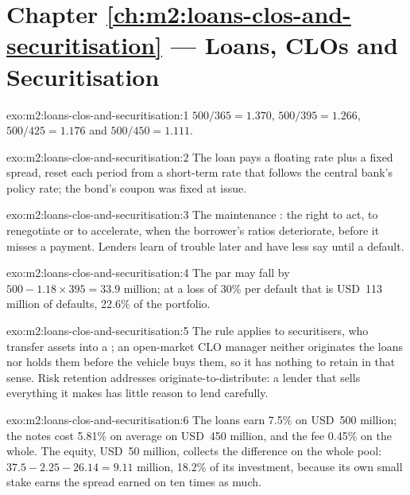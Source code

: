 \section*{Chapter \ref{ch:m2:loans-clos-and-securitisation} --- Loans, CLOs and Securitisation}

\begin{solution}{exo:m2:loans-clos-and-securitisation:1}
$500/365 = 1.370$, $500/395 = 1.266$, $500/425 = 1.176$ and $500/450 = 1.111$.
\end{solution}

\begin{solution}{exo:m2:loans-clos-and-securitisation:2}
The loan pays a floating rate plus a fixed spread, reset each period from a short-term
rate that follows the central bank's policy rate; the bond's coupon was fixed at issue.
\end{solution}

\begin{solution}{exo:m2:loans-clos-and-securitisation:3}
The maintenance : the right to act, to renegotiate or to accelerate, when the
borrower's ratios deteriorate, before it misses a payment. Lenders learn of trouble
later and have less say until a default.
\end{solution}

\begin{solution}{exo:m2:loans-clos-and-securitisation:4}
The par may fall by $500 - 1.18 \times 395 = 33.9$ million; at a loss of 30\% per
default that is USD~113 million of defaults, 22.6\% of the portfolio.
\end{solution}

\begin{solution}{exo:m2:loans-clos-and-securitisation:5}
The rule applies to securitisers, who transfer assets into a ; an
open-market CLO manager neither originates the loans nor holds them before the vehicle
buys them, so it has nothing to retain in that sense. Risk retention addresses
originate-to-distribute: a lender that sells everything it makes has little reason to
lend carefully.
\end{solution}

\begin{solution}{exo:m2:loans-clos-and-securitisation:6}
The loans earn 7.5\% on USD~500 million; the notes cost 5.81\% on average on USD~450
million, and the fee 0.45\% on the whole. The equity, USD~50 million, collects the
difference on the whole pool: $37.5 - 2.25 - 26.14 = 9.11$ million, 18.2\% of its
investment, because its own small stake earns the spread earned on ten times as much.
\end{solution}

